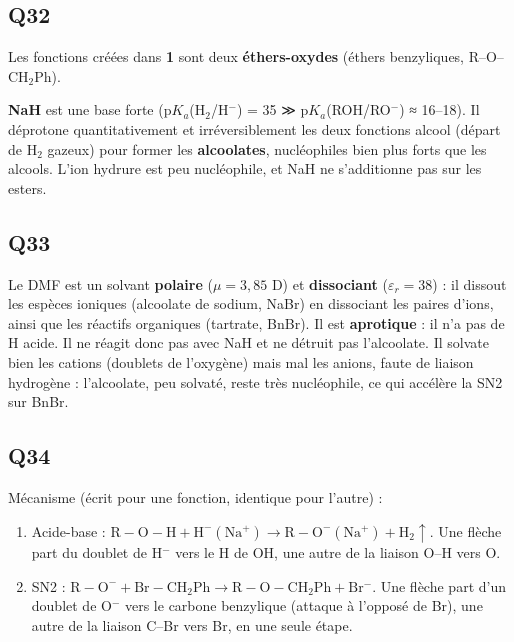 \documentclass[11pt,a4paper]{article}
\providecommand{\tightlist}{\setlength{\itemsep}{0pt}\setlength{\parskip}{0pt}}
\begin{document}
\hypertarget{q32}{%
\subsection{Q32}\label{q32}}

Les fonctions créées dans \textbf{1} sont deux \textbf{éthers-oxydes} (éthers benzyliques, R--O--CH\(_2\)Ph).

\textbf{NaH} est une base forte (p\(K_a\)(H\(_2\)/H\(^-\)) = 35 ≫ p\(K_a\)(ROH/RO\(^-\)) ≈ 16--18). Il déprotone quantitativement et irréversiblement les deux fonctions alcool (départ de H\(_2\) gazeux) pour former les \textbf{alcoolates}, nucléophiles bien plus forts que les alcools. L'ion hydrure est peu nucléophile, et NaH ne s'additionne pas sur les esters.

\hypertarget{q33}{%
\subsection{Q33}\label{q33}}

Le DMF est un solvant \textbf{polaire} (\(\mu=3{,}85\) D) et \textbf{dissociant} (\(\varepsilon_r=38\)) : il dissout les espèces ioniques (alcoolate de sodium, NaBr) en dissociant les paires d'ions, ainsi que les réactifs organiques (tartrate, BnBr). Il est \textbf{aprotique} : il n'a pas de H acide. Il ne réagit donc pas avec NaH et ne détruit pas l'alcoolate. Il solvate bien les cations (doublets de l'oxygène) mais mal les anions, faute de liaison hydrogène : l'alcoolate, peu solvaté, reste très nucléophile, ce qui accélère la SN2 sur BnBr.

\hypertarget{q34}{%
\subsection{Q34}\label{q34}}

Mécanisme (écrit pour une fonction, identique pour l'autre) :

\begin{enumerate}
\def\labelenumi{\arabic{enumi}.}
\tightlist
\item
  Acide-base : \(\mathrm{R{-}O{-}H}+\mathrm{H^-}(\mathrm{Na^+})\longrightarrow\mathrm{R{-}O^-}(\mathrm{Na^+})+\mathrm{H_2}\uparrow\). Une flèche part du doublet de H\(^-\) vers le H de OH, une autre de la liaison O--H vers O.
\item
  SN2 : \(\mathrm{R{-}O^-}+\mathrm{Br{-}CH_2Ph}\longrightarrow\mathrm{R{-}O{-}CH_2Ph}+\mathrm{Br^-}\). Une flèche part d'un doublet de O\(^-\) vers le carbone benzylique (attaque à l'opposé de Br), une autre de la liaison C--Br vers Br, en une seule étape.
\end{enumerate}
\end{document}
